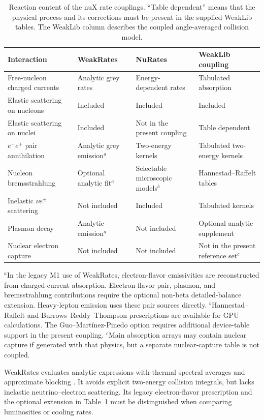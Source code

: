 \documentclass[aps,prd,reprint,nofootinbib,notitlepage]{revtex4-2}
\begin{document}
\begin{table}[t]
\caption{Reaction content of the nuX rate couplings. ``Table dependent''
means that the physical process and its corrections must be present in
the supplied WeakLib tables. The WeakLib column describes the coupled
angle-averaged collision model.}
\label{tab:reactions}
\begin{ruledtabular}
\begin{tabular}{llll}
Interaction & WeakRates & NuRates & WeakLib coupling \\
\hline
Free-nucleon charged currents & Analytic grey rates & Energy-dependent rates & Tabulated absorption \\
Elastic scattering on nucleons & Included & Included & Included \\
Elastic scattering on nuclei & Included & Not in the present coupling & Table dependent \\
$e^-e^+$ pair annihilation & Analytic grey emission$^{a}$ & Two-energy kernels & Tabulated two-energy kernels \\
Nucleon bremsstrahlung & Optional analytic fit$^{a}$ & Selectable microscopic models$^{b}$ & Hannestad--Raffelt tables \\
Inelastic $\nu e^\pm$ scattering & Not included & Included & Tabulated kernels \\
Plasmon decay & Analytic emission$^{a}$ & Not included & Optional analytic supplement \\
Nuclear electron capture & Not included & Not included & Not in the present reference set$^{c}$ \\
\end{tabular}
\end{ruledtabular}
\vspace{2pt}
\parbox{\textwidth}{\footnotesize
$^{a}$In the legacy M1 use of WeakRates, electron-flavor emissivities are
reconstructed from charged-current absorption. Electron-flavor pair,
plasmon, and bremsstrahlung contributions require the optional non-beta
detailed-balance extension. Heavy-lepton emission uses these pair sources
directly.
$^{b}$Hannestad--Raffelt and Burrows--Reddy--Thompson prescriptions are
available for GPU calculations. The Guo--Mart\'inez-Pinedo option requires
additional device-table support in the present coupling.
$^{c}$Main absorption arrays may contain nuclear capture if generated with
that physics, but a separate nuclear-capture table is not coupled.}
\end{table}

WeakRates evaluates analytic expressions with thermal spectral averages
and approximate blocking \cite{WeakRates}. It avoids explicit two-energy
collision integrals, but lacks inelastic neutrino--electron scattering. Its
legacy electron-flavor prescription and the optional extension in
Table~\ref{tab:reactions} must be distinguished when comparing luminosities
or cooling rates.
\end{document}
